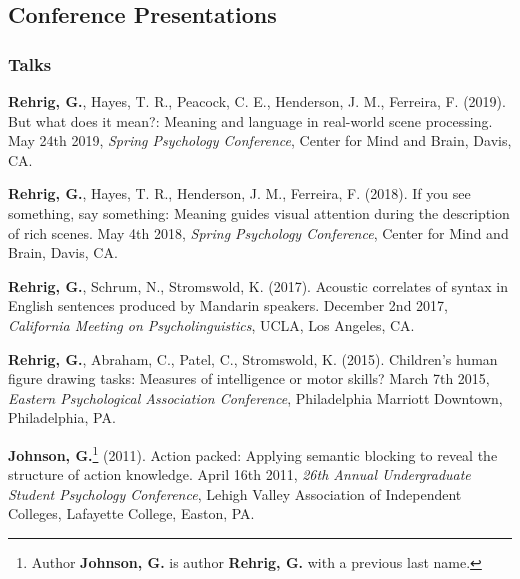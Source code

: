 


\subsection*{Conference Presentations}

\subsubsection*{Talks}

\textbf{Rehrig, G.}, Hayes, T. R., Peacock, C. E., Henderson, J. M., Ferreira, F. (2019). But what does it mean?: Meaning and language in real-world scene processing. May 24th 2019, \textit{Spring Psychology Conference}, Center for Mind and Brain, Davis, CA.


\textbf{Rehrig, G.}, Hayes, T. R., Henderson, J. M., Ferreira, F. (2018). If you see something, say something: Meaning guides visual attention during the description of rich scenes. May 4th 2018, \textit{Spring Psychology Conference}, Center for Mind and Brain, Davis, CA.


\textbf{Rehrig, G.}, Schrum, N., Stromswold, K. (2017). Acoustic correlates of syntax in English sentences produced by Mandarin speakers. December 2nd 2017, \textit{California Meeting on Psycholinguistics}, UCLA, Los Angeles, CA.



\textbf{Rehrig, G.}, Abraham, C., Patel, C., Stromswold, K. (2015). Children's human figure drawing tasks: Measures of intelligence or motor skills? March 7th 2015, \textit{Eastern Psychological Association Conference}, Philadelphia Marriott Downtown, Philadelphia, PA.



\textbf{Johnson, G.}\footnote{Author \textbf{Johnson, G.} is author \textbf{Rehrig, G.} with a previous last name.} (2011). Action packed: Applying semantic blocking to reveal the structure of action knowledge.  April 16th 2011, \textit{26th Annual Undergraduate Student Psychology Conference}, Lehigh Valley Association of Independent Colleges, Lafayette College, Easton, PA.

